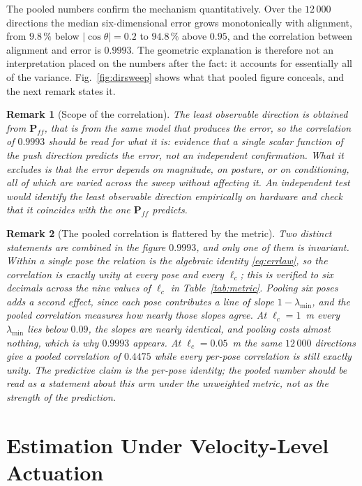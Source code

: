 \documentclass{ieeeaccess}
\newtheorem{remark}{Remark}
\newcommand{\Pff}{\bm{P}_{\!f\!f}}
\newcommand{\lc}{\ell_c}
\begin{document}
The pooled numbers confirm the mechanism quantitatively. Over the $12\,000$
directions the median six-dimensional error grows monotonically with alignment,
from $9.8\,\%$ below $|\cos\theta|=0.2$ to $94.8\,\%$ above $0.95$, and the
correlation between alignment and error is $0.9993$. The geometric explanation is
therefore not an interpretation placed on the numbers after the fact: it accounts
for essentially all of the variance. Fig.~\ref{fig:dirsweep} shows what that
pooled figure conceals, and the next remark states it.

\begin{remark}[Scope of the correlation]
The least observable direction is obtained from $\Pff$, that is from the same
model that produces the error, so the correlation of $0.9993$ should be read for
what it is: evidence that a single scalar function of the push direction predicts
the error, not an independent confirmation. What it excludes is that the error
depends on magnitude, on posture, or on conditioning, all of which are varied
across the sweep without affecting it. An independent test would identify the
least observable direction empirically on hardware and check that it coincides
with the one $\Pff$ predicts.
\end{remark}

\begin{remark}[The pooled correlation is flattered by the metric]
Two distinct statements are combined in the figure $0.9993$, and only one of them
is invariant. Within a single pose the relation is the algebraic identity
\eqref{eq:errlaw}, so the correlation is exactly unity at every pose and every
$\lc$; this is verified to six decimals across the nine values of $\lc$ in
Table~\ref{tab:metric}. Pooling six poses adds a second effect, since each pose
contributes a line of slope $1-\lambda_{\min}$, and the pooled correlation
measures how nearly those slopes agree. At $\lc=1$~m every
$\lambda_{\min}$ lies below $0.09$, the slopes are nearly identical, and pooling
costs almost nothing, which is why $0.9993$ appears. At $\lc=0.05$~m the same
$12\,000$ directions give a pooled correlation of $0.4475$ while every per-pose
correlation is still exactly unity. The predictive claim is the per-pose identity;
the pooled number should be read as a statement about this arm under the
unweighted metric, not as the strength of the prediction.
\end{remark}

\section{Estimation Under Velocity-Level Actuation}
\label{sec:velocity}
\end{document}
